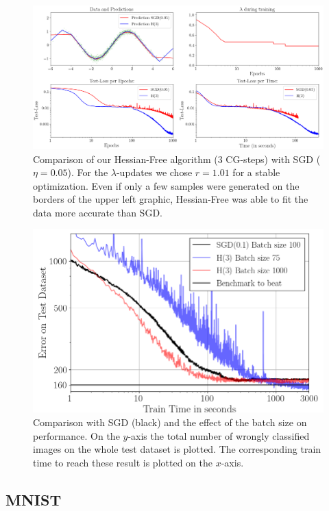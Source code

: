\documentclass[conference]{IEEEtran}
\begin{document}
\begin{figure}[tb]
	\centering
	\includegraphics[width=\textwidth]{toy_005.png}
	\caption{Comparison of our Hessian-Free algorithm (3 CG-steps) with SGD ($\eta=0.05$). For the $\lambda$-updates we chose $r=1.01$ for a stable optimization. Even if only a few samples were generated on the borders of the upper left graphic, Hessian-Free was able to fit the data more accurate than SGD.}
	\label{fig2}
\end{figure}

\begin{figure}[htbp]
	\centerline{\includegraphics[scale=0.52]{Plot_Batch_size.png}}
	\caption{Comparison with SGD (black) and the effect of the batch size on performance. On the $y$-axis the total number of wrongly classified images on the whole test dataset is plotted. The corresponding train time to reach these result is plotted on the $x$-axis.}
	\label{fig3}
\end{figure}

\subsection{MNIST}
\end{document}
